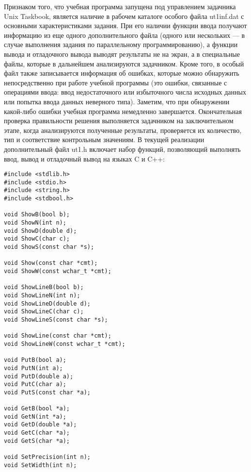 Признаком того, что учебная программа запущена под управлением задачника Unix Taskbook, является наличие в рабочем каталоге особого файла ut1inf.dat с основными характеристиками задания. При его наличии функции ввода получают информацию из еще одного дополнительного файла (одного или нескольких — в случае выполнения задания по параллельному программированию), а функции вывода и отладочного вывода выводят результаты не на экран, а в специальные файлы, которые в дальнейшем анализируются задачником. Кроме того, в особый файл также записывается информация об ошибках, которые можно обнаружить непосредственно при работе учебной программы (это ошибки, связанные с операциями ввода: ввод недостаточного или избыточного числа исходных данных или попытка ввода данных неверного типа). Заметим, что при обнаружении какой-либо ошибки учебная программа немедленно завершается. Окончательная проверка правильности решения выполняется задачником на заключительном этапе, когда анализируются полученные результаты, проверяется их количество, тип и соответствие контрольным значениям.
В текущей реализации дополнительный файл ut1.h включает набор функций, позволяющий выполнять ввод, вывод и отладочный вывод на языках C и C++:

\lstset{language=c++}
\begin{lstlisting}
#include <stdlib.h>
#include <stdio.h>
#include <string.h>
#include <stdbool.h>
    
void ShowB(bool b);
void ShowN(int n);
void ShowD(double d);
void ShowC(char c);
void ShowS(const char *s);
    
void Show(const char *cmt);
void ShowW(const wchar_t *cmt);
    
void ShowLineB(bool b);
void ShowLineN(int n);
void ShowLineD(double d);
void ShowLineC(char c);
void ShowLineS(const char *s);
    
void ShowLine(const char *cmt);
void ShowLineW(const wchar_t *cmt);
    
void PutB(bool a);
void PutN(int a);
void PutD(double a);
void PutC(char a);
void PutS(const char *a);
    
void GetB(bool *a);
void GetN(int *a);
void GetD(double *a);
void GetC(char *a);
void GetS(char *a);
    
void SetPrecision(int n);
void SetWidth(int n);
\end{lstlisting}

